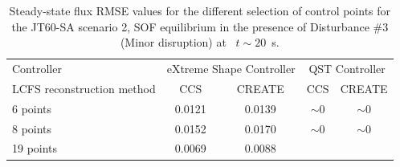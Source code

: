 \begin{table}[]
	\centering
	\begin{tabular}{|l|c|c|c|c|}
		\hline
		\rowcolor{color2}
		\multicolumn{5}{|c|}{\textbf{Disturbance $\#3$ (Minor disruption) flux RMSE steady state      ~ ~ Wb/2$\pi$}}                                                                 \\ \hline
		\rowcolor{color1}
		Controller                 & \multicolumn{2}{c|}{eXtreme Shape Controller} & \multicolumn{2}{c|}{QST Controller}                 \\ \hline
		LCFS reconstruction method & CCS                   & CREATE                & CCS                      & CREATE                   \\ \hline
		6 points                   & 0.0121                & 0.0139                & $\sim 0$               & $\sim 0$                  \\ \hline
		8 points                   & 0.0152                & 0.0170                & $\sim 0$                 & $\sim 0$                  \\ \hline
		19 points                  & 0.0069                & 0.0088                & \cellcolor[HTML]{C0C0C0} & \cellcolor[HTML]{C0C0C0} \\ \hline
	\end{tabular}
	\caption{Steady-state flux RMSE values for the different selection of control points for  the JT60-SA scenario 2, SOF equilibrium in the presence of  Disturbance $\# 3$ (Minor disruption) at ~$t\sim 20 $~s. }
	\label{fluxRMSE_mnr_table}
\end{table}





